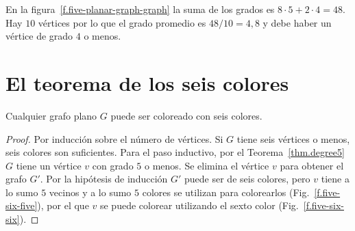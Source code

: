 \begin{example}
En la figura~\ref{f.five-planar-graph-graph} la suma de los grados es $8\cdot 5 + 2\cdot 4=48$. Hay $10$ vértices por lo que el grado promedio es $48/10=4,8$ y debe haber un vértice de grado $4$ o menos.
\end{example}


\section{El teorema de los seis colores}\label{s.six-color}

\begin{theorem}\label{thm.sixcolor}
Cualquier grafo plano $G$ puede ser coloreado con seis colores.
\end{theorem}
\begin{proof}
Por inducción sobre el número de vértices. Si $G$ tiene seis vértices o menos, seis colores son suficientes. Para el paso inductivo, por el Teorema~\ref{thm.degree5} $G$ tiene un vértice $v$ con grado $5$ o menos. Se elimina el vértice $v$ para obtener el grafo $G'$. Por la hipótesis de inducción $G'$ puede ser de seis colores, pero $v$ tiene a lo sumo $5$ vecinos y a lo sumo $5$ colores se utilizan para colorearlos (Fig.~\ref{f.five-six-five}), por el que $v$ se puede colorear utilizando el sexto color (Fig.~\ref{f.five-six-six}).
\end{proof}

